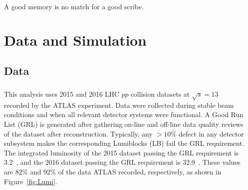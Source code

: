 \begin{savequote}[75mm]
A good memory is no match for a good scribe.
\end{savequote}
\chapter{Data and Simulation}
%

\section{Data}
\label{sec:data}
\paragraph{}
This analysis uses 2015 and 2016 LHC $pp$ collision datasets at $\sqrt{s} = 13$~\TeV~ recorded by the ATLAS experiment. 
Data were collected during stable beam conditions and when all relevant detector systems were functional. 
A Good Run List (GRL) is generated after gathering on-line and off-line data quality reviews of the dataset after reconstruction. 
Typically, any $> 10\%$ defect in any detector subsystem makes the corresponding Lumiblocks (LB) fail the GRL requirement. 
The integrated luminosity of the 2015 dataset passing the GRL requirement is 3.2~\ifb, and the 2016 dataset passing the GRL requirement is 32.9~\ifb. 
These values are $82\%$ and $92\%$ of the data ATLAS recorded, respectively, as shown in Figure~\ref{fig:Lumi}.

